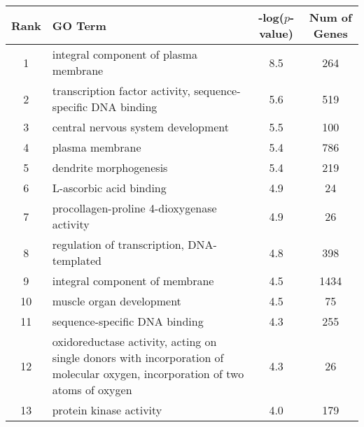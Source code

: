 \centering \begin{tabular}{c|p{4in}|c|c}
Rank	&GO Term	&-log($p$-value)	&Num of Genes\\\hline
1	&integral component of plasma membrane	&8.5	&264\\
2	&transcription factor activity, sequence-specific DNA binding	&5.6	&519\\
3	&central nervous system development	&5.5	&100\\
4	&plasma membrane	&5.4	&786\\
5	&dendrite morphogenesis	&5.4	&219\\
6	&L-ascorbic acid binding	&4.9	&24\\
7	&procollagen-proline 4-dioxygenase activity	&4.9	&26\\
8	&regulation of transcription, DNA-templated	&4.8	&398\\
9	&integral component of membrane	&4.5	&1434\\
10	&muscle organ development	&4.5	&75\\
11	&sequence-specific DNA binding	&4.3	&255\\
12	&oxidoreductase activity, acting on single donors with incorporation of molecular oxygen, incorporation of two atoms of oxygen	&4.3	&26\\
13	&protein kinase activity	&4.0	&179\\
\end{tabular}
